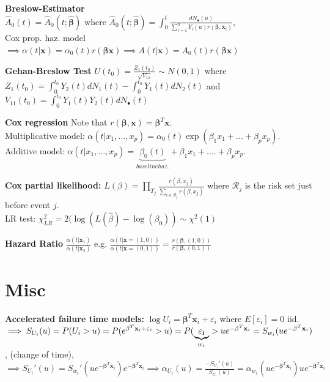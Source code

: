 \documentclass{article}
\begin{document}
\textbf{Breslow-Estimator} $\hat A_0(t) = \hat A_0(t;\hat{\mathbf{\beta}}) \text{ where } 
\hat A_0(t;\hat{\mathbf{\beta}}) = \int_0^t\frac{dN_{\bullet}(u)}{\sum_{l=1}^n Y_l(u)r(\mathbf{\beta}, \mathbf{x}_l)}$, \\ 
Cox prop. haz. model $\implies \alpha(t | \mathbf{x}) = \alpha_0(t)r(\mathbf{\beta}\mathbf{x}) \implies A(t | \mathbf{x}) = A_0(t)r(\mathbf{\beta}\mathbf{x})$

\medskip

\textbf{Gehan-Breslow Test}
$U(t_0) = \frac{Z_1(t_0)}{\sqrt{V_{11}}} \sim N(0,1)$ where 
$Z_1(t_0) = \int_0^{t_0} Y_2(t)dN_1(t) -\int_0^{t_0} Y_1(t)dN_2(t)$ and 
$V_{11}(t_0) = \int_0^{t_0} Y_1(t)Y_2(t)dN_{\bullet}(t)$

\medskip

\textbf{Cox regression} Note that $r(\boldsymbol\beta, \mathbf{x})= \boldsymbol\beta^T\mathbf{x}$. \\
Multiplicative model: $\alpha(t|x_1,...,x_p) = \alpha_0(t)\exp (\beta_1x_1+...+\beta_px_p)$. \\
Additive model:  $\alpha(t|x_1,...,x_p) = \underbrace{\beta_0(t)}_{baseline haz.} + \beta_1 x_1 + ....+ \beta_p x_p$.

\textbf{Cox partial likelihood:}
$L(\beta) = \prod_{T_j} \frac{r(\beta, x_j)}{\sum_{i \in \mathcal{R}_j} r(\beta, x_j)}$ where $\mathcal{R}_j$ is the risk set just before event $j$.\\ 
LR test: $\chi^2_{LR} = 2(\log (L(\hat{\beta}) - \log(\beta_0)) \sim \chi^2(1)$

\medskip

\textbf{Hazard Ratio} $\frac{\alpha(t|\mathbf{x}_1)}{\alpha(t|\mathbf{x}_2)}$ e.g. $\frac{\alpha(t|\mathbf{x} =(1,0))}{\alpha(t|\mathbf{x} =(0,1))} = \frac{r(\mathbf{\beta}, (1,0))}{r(\mathbf{\beta}, (0,1))}$

\newpage

\section*{Misc}

\textbf{Accelerated failure time models:} $\log U_i = \mathbf{\beta}^T\mathbf{x}_i + \varepsilon_i$ where $E[\varepsilon_i]=0$ iid. $\implies S_{U_i}(u)=P(U_i>u)=P(e^{\mathbf{\beta}^T\mathbf{x}_i + \varepsilon_i}>u) = \\ P(\underbrace{\mathbf{\varepsilon_i}}_{w_i} > ue^{-\mathbf{\beta}^T\mathbf{x}_i} = S_{w_i}(ue^{-\mathbf{\beta}^T\mathbf{x}_i})$, (change of time), $\implies S_{U_i}'(u) = S_{w_i}'(ue^{-\mathbf{\beta}^T\mathbf{x}_i})e^{-\mathbf{\beta}^T\mathbf{x}_i} \implies \alpha_{U_i}(u) = \frac{-S_{U_i}'(u)}{S_{U_i}(u)} = \alpha_{w_i}(ue^{-\mathbf{\beta}^T\mathbf{x}_i})ue^{-\mathbf{\beta}^T\mathbf{x}_i}$
\end{document}
